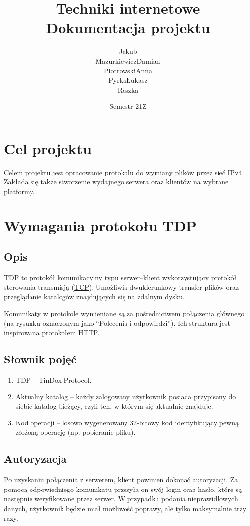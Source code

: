 \documentclass[8pt,a4paper]{article}
\title{Techniki internetowe \\ \large Dokumentacja projektu \quotes{TinDox}}
\author{
    \begin{tabular}{p{6em}p{6em}p{6em}p{6em}}
        \makecell{Jakub \\ Mazurkiewicz} &
        \makecell{Damian \\ Piotrowski} &
        \makecell{Anna \\ Pyrka} &
        \makecell{Łukasz \\ Reszka}
    \end{tabular}
}
\date{Semestr 21Z}
\newcommand{\quotes}[1]{``#1''}
\begin{document}
\maketitle

\tableofcontents
\pagebreak

\section{Cel projektu}
Celem projektu jest opracowanie protokołu do wymiany plików przez sieć IPv4. Zakłada się także stworzenie wydajnego serwera oraz klientów na wybrane platformy.

\section{Wymagania protokołu TDP}

\subsection{Opis}
TDP to protokół komunikacyjny typu serwer--klient wykorzystujący protokół sterowania transmisją (\href{https://en.wikipedia.org/wiki/Transmission_Control_Protocol}{TCP}). Umożliwia dwukierunkowy transfer plików oraz przeglądanie katalogów znajdujących się na zdalnym dysku.

Komunikaty w protokole wymieniane są za pośrednictwem połączenia głównego (na rysunku oznaczonym jako \quotes{Polecenia i odpowiedzi}). Ich struktura jest inspirowana protokołem HTTP.

\subsection{Słownik pojęć}
\begin{enumerate}
    \item TDP -- TinDox Protocol.
    \item Aktualny katalog -- każdy zalogowany użytkownik posiada przypisany do siebie katalog bieżący, czyli ten, w którym się aktualnie znajduje.
    \item Kod operacji -- losowo wygenerowany 32-bitowy kod identyfikujący pewną złożoną operację (np. pobieranie pliku).
\end{enumerate}

\subsection{Autoryzacja}
Po uzyskaniu połączenia z serwerem, klient powinien dokonać autoryzacji. Za pomocą odpowiedniego komunikatu przesyła on swój login oraz hasło, które są następnie weryfikowane przez serwer. W przypadku podania nieprawidłowych danych, użytkownik będzie miał możliwość poprawy, ale tylko maksymalnie trzy razy.
\end{document}

